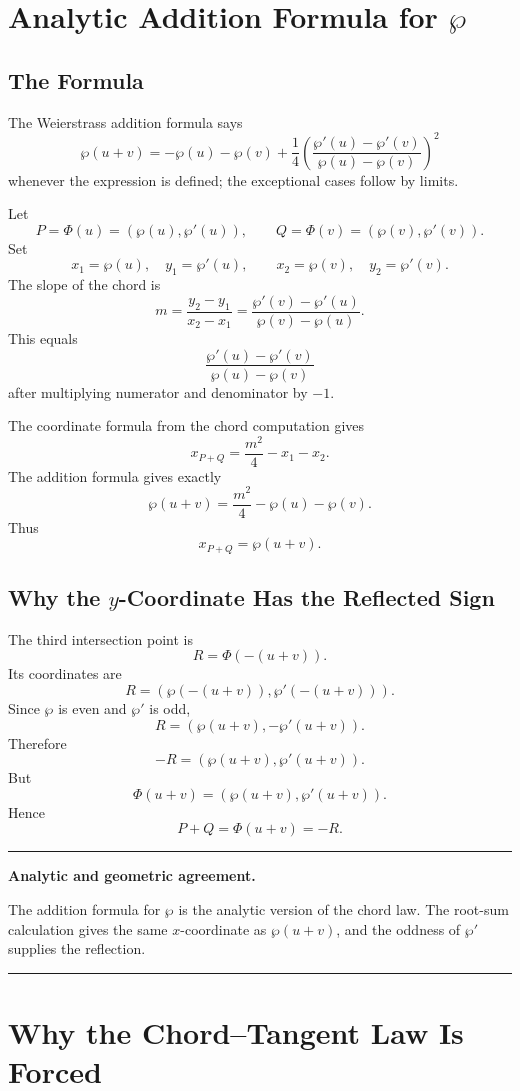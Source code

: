 \documentclass[11pt]{article}
\newenvironment{keyidea}[1]{%
  \par\medskip
  \begin{center}
  \begin{minipage}{0.92\textwidth}
  \hrule
  \smallskip
  \textbf{#1.}\quad\ignorespaces
}{%
  \smallskip
  \hrule
  \end{minipage}
  \end{center}
  \medskip
}
\begin{document}
\section{Analytic Addition Formula for \texorpdfstring{\(\wp\)}{wp}}

\subsection{The Formula}

The Weierstrass addition formula says
\[
\boxed{
\wp(u+v)
=
-\wp(u)-\wp(v)
+
\frac14
\left(
\frac{\wp'(u)-\wp'(v)}{\wp(u)-\wp(v)}
\right)^2
}
\]
whenever the expression is defined; the exceptional cases follow by limits.

Let
\[
P=\Phi(u)=(\wp(u),\wp'(u)),
\qquad
Q=\Phi(v)=(\wp(v),\wp'(v)).
\]
Set
\[
x_1=\wp(u),\quad y_1=\wp'(u),
\qquad
x_2=\wp(v),\quad y_2=\wp'(v).
\]
The slope of the chord is
\[
m=\frac{y_2-y_1}{x_2-x_1}
=
\frac{\wp'(v)-\wp'(u)}{\wp(v)-\wp(u)}.
\]
This equals
\[
\frac{\wp'(u)-\wp'(v)}{\wp(u)-\wp(v)}
\]
after multiplying numerator and denominator by \(-1\).

The coordinate formula from the chord computation gives
\[
x_{P+Q}
=
\frac{m^2}{4}-x_1-x_2.
\]
The addition formula gives exactly
\[
\wp(u+v)
=
\frac{m^2}{4}-\wp(u)-\wp(v).
\]
Thus
\[
x_{P+Q}=\wp(u+v).
\]

\subsection{\texorpdfstring{Why the \(y\)-Coordinate Has the Reflected Sign}{Why the y-Coordinate Has the Reflected Sign}}

The third intersection point is
\[
R=\Phi(-(u+v)).
\]
Its coordinates are
\[
R=(\wp(-(u+v)),\wp'(-(u+v))).
\]
Since \(\wp\) is even and \(\wp'\) is odd,
\[
R=(\wp(u+v),-\wp'(u+v)).
\]
Therefore
\[
-R=(\wp(u+v),\wp'(u+v)).
\]
But
\[
\Phi(u+v)=(\wp(u+v),\wp'(u+v)).
\]
Hence
\[
P+Q=\Phi(u+v)=-R.
\]

\begin{keyidea}{Analytic and geometric agreement}
The addition formula for \(\wp\) is the analytic version of the chord law.
The root-sum calculation gives the same \(x\)-coordinate as
\(\wp(u+v)\), and the oddness of \(\wp'\) supplies the reflection.
\end{keyidea}

\section{Why the Chord--Tangent Law Is Forced}
\end{document}
